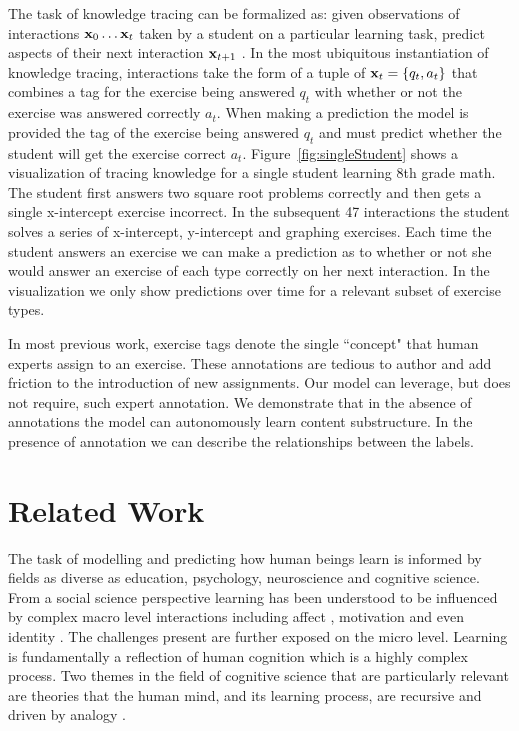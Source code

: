 The task of knowledge tracing can be formalized as: given observations of interactions $\mathbf x_0 \dots \mathbf x_{t}$ taken by a student on a particular learning task, predict aspects of their next interaction $\mathbf x_{t+1}$ \cite{corbett1994knowledge}. In the most ubiquitous instantiation of knowledge tracing, interactions take the form of a tuple of $\mathbf x_t = \{q_t, a_t\}$ that combines a tag for the exercise being answered $q_t$ with whether or not the exercise was answered correctly $a_t$.  When making a prediction the model is provided the tag of the exercise being answered $q_t$ and must predict whether the student will get the exercise correct $a_t$. Figure~\ref{fig:singleStudent} shows a visualization of tracing knowledge for a single student learning 8th grade math. The student first answers two square root problems correctly and then gets a single x-intercept exercise incorrect. In the subsequent 47 interactions the student solves a series of x-intercept, y-intercept and graphing exercises. Each time the student answers an exercise we can make a prediction as to whether or not she would answer an exercise of each type correctly on her next interaction. In the visualization we only show predictions over time for a relevant subset of exercise types.

In most previous work, exercise tags denote the single ``concept" that human experts assign to an exercise. These annotations are tedious to author and add friction to the introduction of new assignments.
Our model can leverage, but does not require, such expert annotation. We demonstrate that in the absence of annotations the model can autonomously learn content substructure. In the presence of annotation we can describe the relationships between the labels.

\section{Related Work}

The task of modelling and predicting how human beings learn is informed by fields as diverse as education, psychology, neuroscience and cognitive science. From a social science perspective learning has been understood to be influenced by complex macro level interactions including affect \cite{linnenbrink2004role},
motivation \cite{elliot2013handbook}
and even identity \cite{cohen2008identity}. The challenges present are further exposed on the micro level. Learning is fundamentally a reflection of human cognition which is a highly complex process. Two themes in the field of cognitive science that are particularly relevant are theories that the human mind, and its learning process, are recursive \cite{fitch2005evolution} and driven by analogy \cite{gentner1983structure}.


